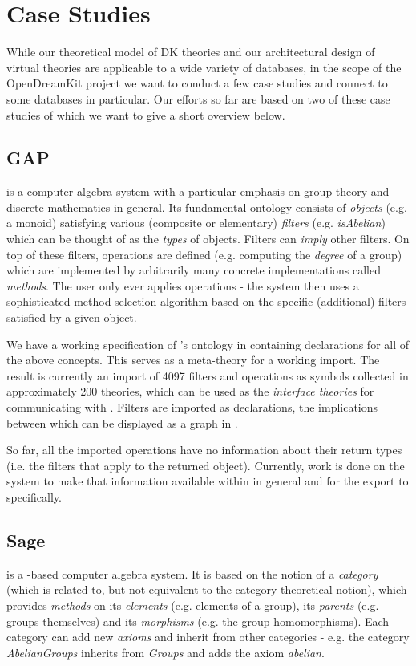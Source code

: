 \section{Case Studies}\label{sec:cases}

While our theoretical model of DK theories and our architectural design of virtual
theories are applicable to a wide variety of databases, in the scope of the OpenDreamKit
project we want to conduct a few case studies and connect to some databases in
particular. Our efforts so far are based on two of these case studies of which we want to
give a short overview below.

\subsection{GAP}\label{sec:gap}
\GAP \cite{gap} is a computer algebra system with a particular emphasis on group theory and discrete mathematics in general. Its fundamental
ontology consists of \emph{objects} (e.g. a monoid) satisfying various (composite or elementary) \emph{filters} (e.g. \emph{isAbelian}) which
can be thought of as the \emph{types} of objects. Filters can \emph{imply} other filters.
On top of these filters, operations are defined (e.g. computing the \emph{degree} of a group) which are implemented by arbitrarily many concrete implementations
called \emph{methods}. The user only ever applies operations - the \GAP system then uses a sophisticated method selection algorithm based on
the specific (additional) filters satisfied by a given object.

We have a working specification of \GAP's ontology in \MMT containing declarations for all of the above concepts. This serves as a meta-theory for a working \GAP import. The result is currently an import
of 4097 filters and operations as \MMT symbols collected in approximately 200 theories, which can be used as the \emph{interface theories} for communicating with \GAP. Filters
are imported as \MMT declarations, the implications between which can be displayed as a graph in \MMT.

So far, all the imported operations have no information about their return types (i.e. the filters that apply to the returned object). Currently, work is done
on the \GAP system to make that information available within \GAP in general and for the export to \MMT specifically.

\subsection{Sage}\label{sec:sage}
\SageMath \cite{sagemath} is a \python-based computer algebra system. It is based on the notion of a \emph{category} (which is related to, but not equivalent to the category theoretical notion),
which provides \emph{methods} on its \emph{elements} (e.g. elements of a group), its \emph{parents} (e.g. groups themselves) and its \emph{morphisms}
(e.g. the group homomorphisms). Each category can add new \emph{axioms} and inherit from other categories - e.g. the category \emph{AbelianGroups} inherits from \emph{Groups} and adds the axiom \emph{abelian}.

